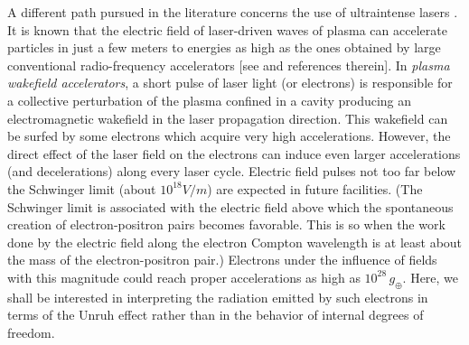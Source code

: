 \documentclass[12pt,nofootinbib,floatfix,aps,prd,showpacs,amsmath,amssymb,eqsecnum]{revtex4-2}
\begin{document}
A different path pursued in the literature 
concerns the use of ultraintense
lasers \cite{Chenetal99,Schutzholdetal06}. It is known that the electric 
field of laser-driven waves of plasma can accelerate particles 
in just a few meters to energies as high as the ones obtained by large 
conventional  radio-frequency accelerators [see \textcite{Mourouetal06} 
and references therein]. In {\em plasma wakefield accelerators}, a short pulse of 
laser light (or electrons) is responsible for a collective perturbation of 
the plasma confined in a cavity producing an electromagnetic wakefield 
in the laser propagation direction. This wakefield can be surfed by some
electrons which acquire very high accelerations. 
However, the direct effect of the laser field  on the electrons 
can induce even larger accelerations (and decelerations) along 
every laser cycle. Electric field pulses not too far below the Schwinger limit 
(about $10^{18} V/m$) are expected in future facilities.  
(The Schwinger limit is 
associated with the electric field above which the spontaneous creation 
of electron-positron pairs becomes favorable. This is so when 
the work done by the electric field along the electron Compton 
wavelength is at 
least about the mass of the electron-positron pair.) Electrons under the
influence of fields with this magnitude could reach proper accelerations 
as high as $ 10^{28} \, g_{\oplus}$. Here, we shall be interested in interpreting
the radiation emitted by such electrons in terms of the Unruh effect
rather than in the behavior of internal degrees of freedom.
\end{document}

